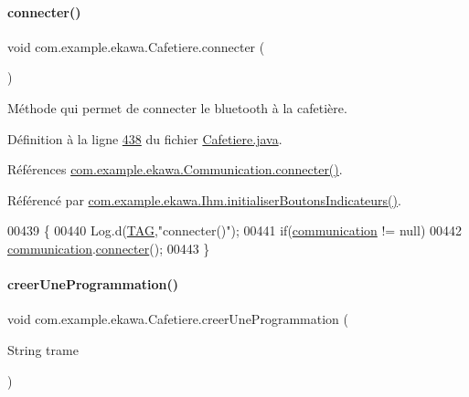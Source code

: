 \paragraph{\texorpdfstring{connecter()}{connecter()}}
{\footnotesize\ttfamily void com.\+example.\+ekawa.\+Cafetiere.\+connecter (\begin{DoxyParamCaption}{ }\end{DoxyParamCaption})}



Méthode qui permet de connecter le bluetooth à la cafetière. 



Définition à la ligne \hyperlink{_cafetiere_8java_source_l00438}{438} du fichier \hyperlink{_cafetiere_8java_source}{Cafetiere.\+java}.



Références \hyperlink{_communication_8java_source_l00226}{com.\+example.\+ekawa.\+Communication.\+connecter()}.



Référencé par \hyperlink{_ihm_8java_source_l00357}{com.\+example.\+ekawa.\+Ihm.\+initialiser\+Boutons\+Indicateurs()}.


\begin{DoxyCode}
00439     \{
00440         Log.d(\hyperlink{classcom_1_1example_1_1ekawa_1_1_cafetiere_aa0c1fd99a2508b06c462aea17034aa91}{TAG},\textcolor{stringliteral}{"connecter()"});
00441         \textcolor{keywordflow}{if}(\hyperlink{classcom_1_1example_1_1ekawa_1_1_cafetiere_af9506a7805d000d2cb83444cdb8ea889}{communication} != null)
00442             \hyperlink{classcom_1_1example_1_1ekawa_1_1_cafetiere_af9506a7805d000d2cb83444cdb8ea889}{communication}.\hyperlink{classcom_1_1example_1_1ekawa_1_1_communication_af0cb2a6a5c1674a7204174ba786e8596}{connecter}();
00443     \}
\end{DoxyCode}
\mbox{\label{classcom_1_1example_1_1ekawa_1_1_cafetiere_a8664d05f55227160182de50a7c31ccf3}} 
\paragraph{\texorpdfstring{creer\+Une\+Programmation()}{creerUneProgrammation()}}
{\footnotesize\ttfamily void com.\+example.\+ekawa.\+Cafetiere.\+creer\+Une\+Programmation (\begin{DoxyParamCaption}\item[{String}]{trame }\end{DoxyParamCaption})\hspace{0.3cm}{\ttfamily [private]}}




